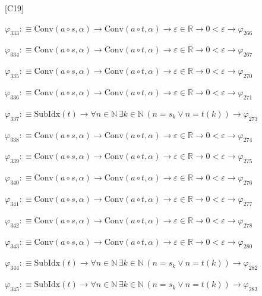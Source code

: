 \begin{fullproof}{[C19]}
\begin{abbrevlist}
\item $\varphi_{333} :\equiv \mathrm{Conv}(a \circ s,\alpha) \to \mathrm{Conv}(a \circ t,\alpha) \to \varepsilon \in \mathbb{R} \to 0 < \varepsilon \to \varphi_{266}$
\item $\varphi_{334} :\equiv \mathrm{Conv}(a \circ s,\alpha) \to \mathrm{Conv}(a \circ t,\alpha) \to \varepsilon \in \mathbb{R} \to 0 < \varepsilon \to \varphi_{267}$
\item $\varphi_{335} :\equiv \mathrm{Conv}(a \circ s,\alpha) \to \mathrm{Conv}(a \circ t,\alpha) \to \varepsilon \in \mathbb{R} \to 0 < \varepsilon \to \varphi_{270}$
\item $\varphi_{336} :\equiv \mathrm{Conv}(a \circ s,\alpha) \to \mathrm{Conv}(a \circ t,\alpha) \to \varepsilon \in \mathbb{R} \to 0 < \varepsilon \to \varphi_{271}$
\item $\varphi_{337} :\equiv \mathrm{SubIdx}(t) \to \forall n \in \mathbb{N}\,\exists k \in \mathbb{N}\,(n = s_{k} \lor n = t(k)) \to \varphi_{273}$
\item $\varphi_{338} :\equiv \mathrm{Conv}(a \circ s,\alpha) \to \mathrm{Conv}(a \circ t,\alpha) \to \varepsilon \in \mathbb{R} \to 0 < \varepsilon \to \varphi_{274}$
\item $\varphi_{339} :\equiv \mathrm{Conv}(a \circ s,\alpha) \to \mathrm{Conv}(a \circ t,\alpha) \to \varepsilon \in \mathbb{R} \to 0 < \varepsilon \to \varphi_{275}$
\item $\varphi_{340} :\equiv \mathrm{Conv}(a \circ s,\alpha) \to \mathrm{Conv}(a \circ t,\alpha) \to \varepsilon \in \mathbb{R} \to 0 < \varepsilon \to \varphi_{276}$
\item $\varphi_{341} :\equiv \mathrm{Conv}(a \circ s,\alpha) \to \mathrm{Conv}(a \circ t,\alpha) \to \varepsilon \in \mathbb{R} \to 0 < \varepsilon \to \varphi_{277}$
\item $\varphi_{342} :\equiv \mathrm{Conv}(a \circ s,\alpha) \to \mathrm{Conv}(a \circ t,\alpha) \to \varepsilon \in \mathbb{R} \to 0 < \varepsilon \to \varphi_{278}$
\item $\varphi_{343} :\equiv \mathrm{Conv}(a \circ s,\alpha) \to \mathrm{Conv}(a \circ t,\alpha) \to \varepsilon \in \mathbb{R} \to 0 < \varepsilon \to \varphi_{280}$
\item $\varphi_{344} :\equiv \mathrm{SubIdx}(t) \to \forall n \in \mathbb{N}\,\exists k \in \mathbb{N}\,(n = s_{k} \lor n = t(k)) \to \varphi_{282}$
\item $\varphi_{345} :\equiv \mathrm{SubIdx}(t) \to \forall n \in \mathbb{N}\,\exists k \in \mathbb{N}\,(n = s_{k} \lor n = t(k)) \to \varphi_{283}$

\end{abbrevlist}
\end{fullproof}
